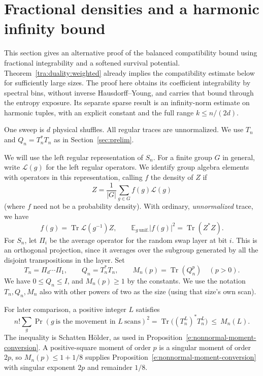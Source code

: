 \section{Fractional densities and a harmonic infinity bound}\label{tra:fractional-density}

This section gives an alternative proof of the balanced compatibility
bound using fractional integrability and a softened survival potential.
Theorem~\ref{tra:duality:weighted} already implies the compatibility
estimate below for sufficiently large sizes. The proof here obtains its
coefficient integrability by spectral bins, without inverse
Hausdorff--Young, and carries that bound through the entropy exposure.
Its separate sparse result is an infinity-norm estimate on harmonic
tuples, with an explicit constant and the full range $k\le n/(2d)$.

One sweep is $d$ physical shuffles. All regular traces are unnormalized.
We use $T_n$ and $Q_n=T_n^*T_n$ as in Section~\ref{sec:prelim}.

\label{tra:fractional-density:density-normalization}
We will use the left regular representation of \(S_n\). For a finite group \(G\) in general, write \(\mathcal L(g)\) for the left regular operators. We identify group algebra elements with operators in this representation, calling \(f\) the density of \(Z\) if
\[
 Z=\frac{1}{|G|}\sum_{g\in G} f(g)\mathcal L(g)
\]
(where \(f\) need not be a probability density). With ordinary, \emph{unnormalized} trace, we have
\begin{equation}
 f(g)=\operatorname{Tr}\mathcal L(g^{-1})Z,\qquad
 \mathbb E_{g\ \mathrm{unif.}} |f(g)|^2=\operatorname{Tr}(Z^*Z).
 \label{tra:fractional-density:eq1}
\end{equation}
For \(S_n\), let \(\Pi_i\) be the average operator for the random swap layer at bit \(i\). This is an orthogonal projection, since it averages over the subgroup generated by all the disjoint transpositions in the layer. Set
\[
 T_n=\Pi_d\cdots\Pi_1,\qquad Q_n=T_n^* T_n,\qquad
 M_n(p)=\operatorname{Tr}(Q_n^p)\quad (p>0).
\]
We have \(0\le Q_n\le I\), and \(M_n(p)\ge 1\) by the constants. We use the notation \(T_n,Q_n,M_n\) also with other powers of two as the size (using that size's own scan).

\label{tra:fractional-density:power-log-majorization-and-mixing}
For later comparison, a positive integer \(L\) satisfies
\begin{equation}
 n!\sum_g \Pr(g\ \text{is the movement in }L\ \text{scans})^2
  =\operatorname{Tr}\big((T_n^L)^*T_n^L\big)\ \le\ M_n(L).
 \label{tra:fractional-density:eq3}
\end{equation}
The inequality is Schatten H\"older, as used in
Proposition~\ref{e:nonnormal-moment-conversion}. A positive-square moment of
order $p$ is a singular moment of order $2p$, so
$M_n(p)\le1+1/8$ supplies Proposition~\ref{e:nonnormal-moment-conversion}
with singular exponent $2p$ and remainder $1/8$.

